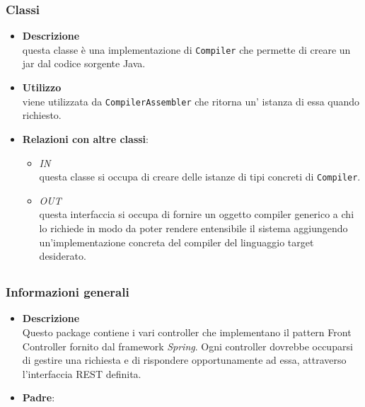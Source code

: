\subsubsection{Classi}
\label{\nogloxy{swedesigner::server::compiler::java::JavaCompiler}}
\begin{itemize}
\item \textbf{Descrizione}\\
questa classe è una implementazione di \texttt{Compiler} che permette di creare un jar dal codice sorgente Java.
\item \textbf{Utilizzo}\\
viene utilizzata da \texttt{CompilerAssembler} che ritorna un' istanza di essa quando richiesto.
\item \textbf{Relazioni con altre classi}:
\begin{itemize}
\item \textit{IN} \hyperref[\nogloxy{swedesigner::server::compiler::CompilerAssembler}]{}\\
questa classe si occupa di creare delle istanze di tipi concreti di \texttt{Compiler}. 
\item \textit{OUT} \hyperref[\nogloxy{swedesigner::server::compiler::Compiler}]{}\\
questa interfaccia si occupa di fornire un oggetto compiler generico a chi lo richiede in modo da poter rendere entensibile il sistema aggiungendo un'implementazione concreta del compiler del linguaggio target desiderato.
\end{itemize}
\end{itemize}
\subsection{}
\label{\nogloxy{swedesigner::server::controller}}
\subsubsection{Informazioni generali}
\begin{itemize}
\item \textbf{Descrizione}\\
Questo package contiene i vari controller che implementano il pattern Front Controller fornito dal framework \emph{Spring}. Ogni controller dovrebbe occuparsi di gestire una richiesta e di rispondere opportunamente ad essa, attraverso l'interfaccia REST definita.
\item \textbf{Padre}: \hyperref[\nogloxy{swedesigner::server}]{}
\end{itemize}
